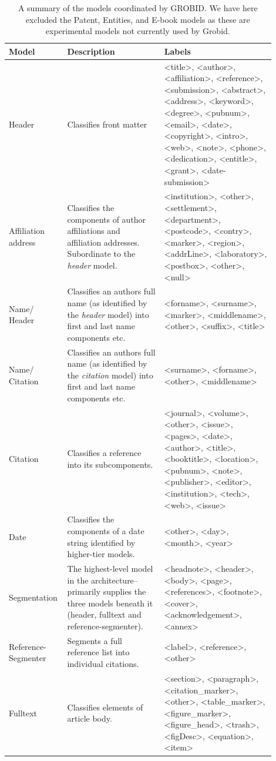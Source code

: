 \begin{center}
\begin{table}
\begin{tabular}{ | p{0.15\linewidth} | p{0.35\linewidth} | p{0.4\linewidth} |}
	\hline
	Model & Description & Labels \\ \hline
    Header & Classifies front matter & <title>, <author>, <affiliation>, <reference>, <submission>, <abstract>, <address>, <keyword>, <degree>, <pubnum>, <email>, <date>, <copyright>, <intro>, <web>, <note>, <phone>, <dedication>, <entitle>, <grant>, <date-submission> \\ \hline
	Affiliation address & Classifies the components of author affiliations and affiliation addresses. Subordinate to the \emph{header} model. & <institution>, <other>, <settlement>, <department>, <postcode>, <contry>, <marker>, <region>, <addrLine>, <laboratory>, <postbox>, <other>, <null> \\ \hline
	Name/ Header & Classifies an authors full name (as identified by the \emph{header} model) into first and last name components etc.  & <forname>, <surname>, <marker>, <middlename>, <other>, <suffix>, <title> \\ \hline
	Name/ Citation &  Classifies an authors full name (as identified by the \emph{citation} model) into first and last name components etc. & <surname>, <forname>, <other>, <middlename> \\ \hline
	Citation & Classifies a reference into its subcomponents. & <journal>, <volume>, <other>, <issue>, <pages>, <date>, <author>, <title>, <booktitle>, <location>, <pubnum>, <note>, <publisher>, <editor>, <institution>, <tech>, <web>, <issue> \\ \hline
	Date & Classifies the components of a date string identified by higher-tier models. & <other>, <day>, <month>, <year> \\ \hline
	Segmentation & The highest-level model in the architecture--primarily supplies the three models beneath it (header, fulltext and reference-segmenter). & <headnote>, <header>, <body>, <page>, <references>, <footnote>, <cover>, <acknowledgement>, <annex> \\ \hline
	Reference-Segmenter & Segments a full reference list into individual citations. & <label>, <reference>, <other> \\ \hline
	Fulltext & Classifies elements of article body. & <section>, <paragraph>, <citation\_marker>, <other>, <table\_marker>, <figure\_marker>, <figure\_head>, <trash>, <figDesc>, <equation>, <item> \\ \hline
\end{tabular}
\caption{A summary of the models coordinated by GROBID. We have here excluded the Patent, Entities, and E-book models as these are experimental models not currently used by Grobid.}
\label{table:featurelist}
\end{table}
\end{center}

